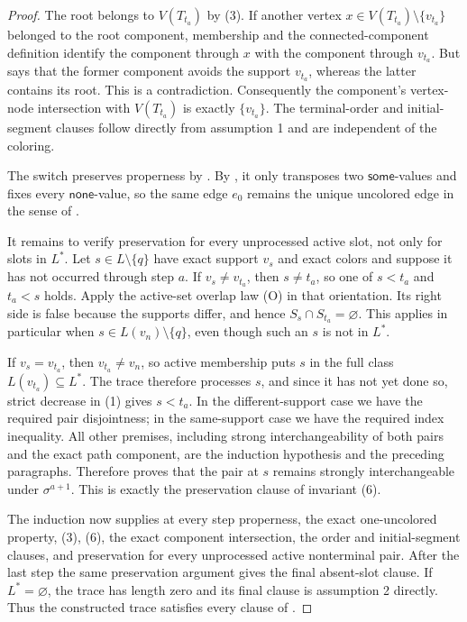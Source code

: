 \begin{proof}
The root belongs to \(V(T_{t_a})\) by (3).  If another vertex
\(x\in V(T_{t_a})\setminus\{v_{t_a}\}\) belonged to the root component,
membership and the connected-component definition
 identify the component through \(x\) with the
component through \(v_{t_a}\).  But
 says that the former component avoids
the support \(v_{t_a}\), whereas the latter contains its root.  This is a
contradiction.  Consequently the component's vertex-node intersection
with \(V(T_{t_a})\) is exactly \(\{v_{t_a}\}\).  The terminal-order and
initial-segment clauses follow directly from assumption 1 and are
independent of the coloring.

The switch preserves properness by
.  By
, it only transposes two
\(\mathsf{some}\)-values and fixes every \(\mathsf{none}\)-value, so the
same edge \(e_0\) remains the unique uncolored edge in the sense of
.

It remains to verify preservation for every unprocessed active slot, not
only for slots in \(L^*\).  Let \(s\in L\setminus\{q\}\) have exact
support \(v_s\) and exact colors and suppose it has not occurred through
step \(a\).  If \(v_s\ne v_{t_a}\), then \(s\ne t_a\), so one of
\(s<t_a\) and \(t_a<s\) holds.  Apply the active-set overlap law (O) in
that orientation.  Its right side is false because the supports differ,
and hence \(S_s\cap S_{t_a}=\varnothing\).  This applies in particular
when \(s\in L(v_n)\setminus\{q\}\), even though such an \(s\) is not in
\(L^*\).

If \(v_s=v_{t_a}\), then \(v_{t_a}\ne v_n\), so active membership puts
\(s\) in the full class \(L(v_{t_a})\subseteq L^*\).  The trace therefore
processes \(s\), and since it has not yet done so, strict decrease in (1)
gives \(s<t_a\).  In the different-support case we have the required
pair disjointness; in the same-support case we have the required index
inequality.  All other premises, including strong interchangeability of
both pairs and the exact path component, are the induction hypothesis and
the preceding paragraphs.  Therefore
 proves that the pair at
\(s\) remains strongly interchangeable under \(\sigma^{a+1}\).  This is
exactly the preservation clause of invariant (6).

The induction now supplies at every step properness, the exact
one-uncolored property, (3), (6), the exact component intersection, the
order and initial-segment clauses, and preservation for every unprocessed
active nonterminal pair.  After the last step the same preservation
argument gives the final absent-slot clause.  If \(L^*=\varnothing\),
the trace has length zero and its final clause is assumption 2 directly.
Thus the constructed trace satisfies every clause of
.
\end{proof}
